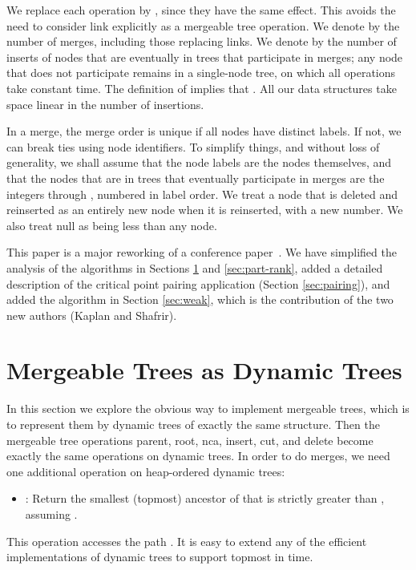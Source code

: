 \documentclass[twoside,leqno,twocolumn]{article}
\begin{document}
We replace each operation  by , since they have the same effect.  This avoids the need to consider link explicitly as a mergeable tree operation.  We denote by  the number of merges, including those replacing links. We denote by  the number of inserts of nodes that are eventually in trees that participate in merges; any node that does not participate remains in a single-node tree, on which all operations take constant time. The definition of  implies that . All our data structures take space linear in the number of insertions.

In a merge, the merge order is unique if all nodes have distinct labels.  If not, we can break ties using node identifiers.  To simplify things, and without loss of generality, we shall assume that the node labels are the nodes themselves, and that the nodes that are in trees that eventually participate in merges are the integers  through , numbered in label order.  We treat a node that is deleted and reinserted as an entirely new node when it is reinserted, with a new number. We also treat null as being less than any node.


This paper is a major reworking of a conference paper~\cite{GTW06}.  We have simplified the analysis of the algorithms in Sections \ref{sec:dyntrees} and \ref{sec:part-rank}, added a detailed description of the critical point pairing application (Section \ref{sec:pairing}), and added the algorithm in Section \ref{sec:weak}, which is the contribution of the two new authors (Kaplan and Shafrir).



\section{Mergeable Trees as Dynamic Trees}
\label{sec:dyntrees}

In this section we explore the obvious way to implement mergeable trees, which is to represent them by dynamic trees of exactly the same structure.  Then the mergeable tree operations parent, root, nca, insert, cut, and delete become exactly the same operations on dynamic trees.  In order to do merges, we need one additional operation on heap-ordered dynamic trees:

\begin{itemize}
\item : Return the smallest (topmost) ancestor of  that is strictly greater than , assuming .
\end{itemize}

This operation accesses the path .  It is easy to extend any of the efficient implementations of dynamic trees to support topmost in  time.
\end{document}
